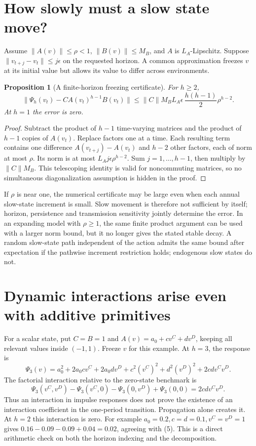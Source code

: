 \documentclass[11pt,a4paper]{article}
\newtheorem{proposition}[theorem]{Proposition}
\begin{document}
\section{How slowly must a slow state move?}
Assume $\|A(v)\|\le\rho<1$, $\|B(v)\|\le M_B$, and $A$ is $L_A$-Lipschitz. Suppose $\|v_{t+j}-v_t\|\le j\epsilon$ on the requested horizon. A common approximation freezes $v$ at its initial value but allows its value to differ across environments.
\begin{proposition}[A finite-horizon freezing certificate]
For $h\ge2$,
\[
 \|\Psi_h(v_t)-CA(v_t)^{h-1}B(v_t)\|
 \le \|C\|M_B L_A\epsilon\,
       \frac{h(h-1)}2\rho^{h-2}. \tag{4}
\]
At $h=1$ the error is zero.
\end{proposition}
\begin{proof}
Subtract the product of $h-1$ time-varying matrices and the product of $h-1$ copies of $A(v_t)$. Replace factors one at a time. Each resulting term contains one difference $A(v_{t+j})-A(v_t)$ and $h-2$ other factors, each of norm at most $\rho$. Its norm is at most $L_Aj\epsilon\rho^{h-2}$. Sum $j=1,\ldots,h-1$, then multiply by $\|C\|M_B$. This telescoping identity is valid for noncommuting matrices, so no simultaneous diagonalization assumption is hidden in the proof.
\end{proof}

If $\rho$ is near one, the numerical certificate may be large even when each annual slow-state increment is small. Slow movement is therefore not sufficient by itself; horizon, persistence and transmission sensitivity jointly determine the error. In an expanding model with $\rho\ge1$, the same finite product argument can be used with a larger norm bound, but it no longer gives the stated stable decay. A random slow-state path independent of the action admits the same bound after expectation if the pathwise increment restriction holds; endogenous slow states do not.

\section{Dynamic interactions arise even with additive primitives}
For a scalar state, put $C=B=1$ and $A(v)=a_0+c v^C+d v^D$, keeping all relevant values inside $(-1,1)$. Freeze $v$ for this example. At $h=3$, the response is
\[
 \Psi_3(v)=a_0^2+2a_0cv^C+2a_0dv^D
          +c^2(v^C)^2+d^2(v^D)^2+2cdv^Cv^D.
\]
The factorial interaction relative to the zero-state benchmark is
\[
 \Psi_3(v^C,v^D)-\Psi_3(v^C,0)-\Psi_3(0,v^D)+\Psi_3(0,0)
 =2cdv^Cv^D. \tag{5}
\]
Thus an interaction in impulse responses does not prove the existence of an interaction coefficient in the one-period transition. Propagation alone creates it. At $h=2$ this interaction is zero. For example $a_0=0.2,c=d=0.1,v^C=v^D=1$ gives $0.16-0.09-0.09+0.04=0.02$, agreeing with (5). This is a direct arithmetic check on both the horizon indexing and the decomposition.
\end{document}
